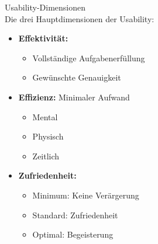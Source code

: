 \begin{definition}{Usability-Dimensionen}\\
Die drei Hauptdimensionen der Usability:
\begin{itemize}
    \item \textbf{Effektivität:}
    \begin{itemize}
        \item Vollständige Aufgabenerfüllung
        \item Gewünschte Genauigkeit
    \end{itemize}
    \end{itemize}

\begin{minipage}{0.5\linewidth}
    \begin{itemize}
    \item \textbf{Effizienz:} Minimaler Aufwand
    \begin{itemize}
        \item Mental
        \item Physisch
        \item Zeitlich
    \end{itemize}
    \end{itemize}
\end{minipage}
\begin{minipage}{0.5\linewidth}
    \begin{itemize}
    \item \textbf{Zufriedenheit:}
    \begin{itemize}
        \item Minimum: Keine Verärgerung
        \item Standard: Zufriedenheit
        \item Optimal: Begeisterung
    \end{itemize}
\end{itemize}
\end{minipage}
\end{definition}

